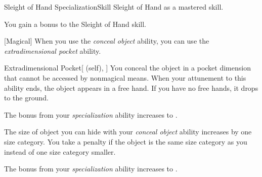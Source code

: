     \begin{feat}{Sleight of Hand Specialization}{Skill}
        \featpre Sleight of Hand as a mastered skill.

         You gain a  bonus to the Sleight of Hand skill.


        [Magical] When you use the \textit{conceal object} ability, you can use the \textit{extradimensional pocket} ability.
        \begin{attuneability}{Extradimensional Pocket}[ (self), ]
            You conceal the object in a pocket dimension that cannot be accessed by nonmagical means.
            When your attunement to this ability ends, the object appears in a free hand.
            If you have no free hands, it drops to the ground.
        \end{attuneability}

         The bonus from your \textit{specialization} ability increases to .

         The size of object you can hide with your \textit{conceal object} ability increases by one size category.
        You take a  penalty if the object is the same size category as you instead of one size category smaller.

         The bonus from your \textit{specialization} ability increases to .

    \end{feat}

